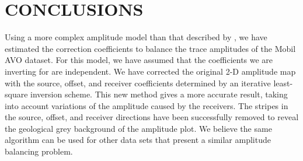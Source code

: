 \section{CONCLUSIONS}
\par
Using a more complex amplitude model than that described
by \cite{Berlioux.sep.80.349}, we have estimated the correction
coefficients to balance the trace amplitudes of the Mobil AVO
dataset. For this model, we have assumed that the coefficients we are
inverting for are independent. We have corrected the original 2-D
amplitude map with the source, offset, and receiver coefficients
determined by an iterative least-square inversion scheme. This new
method gives a more accurate result, taking into account variations of
the amplitude caused by the receivers.  The stripes in the source,
offset, and receiver directions have been successfully removed to
reveal the geological grey background of the amplitude plot. We
believe the same algorithm can be used for other data sets that
present a similar amplitude balancing problem.


%


